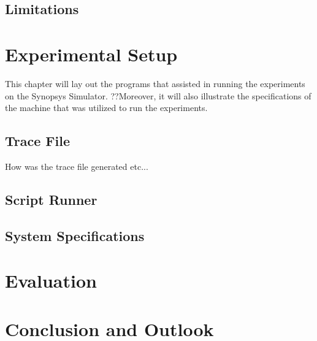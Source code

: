 \documentclass{listhesis}
\begin{document}
\section{Limitations}

\chapter{Experimental Setup}
This chapter will lay out the programs that assisted in running the experiments on the Synopsys Simulator. ??Moreover, it will also illustrate the specifications of the machine that was utilized to run the experiments.
\section{Trace File}
How was the trace file generated etc...
\section{Script Runner}

\section{System Specifications}

\chapter{Evaluation}

\chapter{Conclusion and Outlook}


\cleardoublepage



\confirmation
\end{document}
